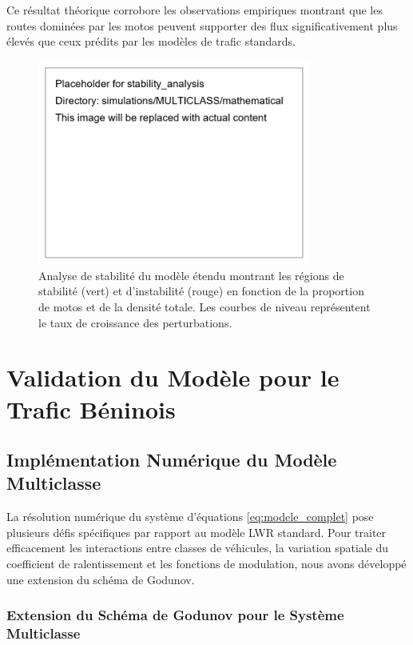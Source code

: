 Ce résultat théorique corrobore les observations empiriques montrant que les routes dominées par les motos peuvent supporter des flux significativement plus élevés que ceux prédits par les modèles de trafic standards.

\begin{figure}[htbp]
\centering
\includegraphics[width=0.8\textwidth]{simulations/MULTICLASS/mathematical/stability_analysis}
\caption{Analyse de stabilité du modèle étendu montrant les régions de stabilité (vert) et d'instabilité (rouge) en fonction de la proportion de motos et de la densité totale. Les courbes de niveau représentent le taux de croissance des perturbations.}
\label{fig:stability_analysis}
\end{figure}

\section{Validation du Modèle pour le Trafic Béninois}
\label{sec:validation_benin}

\subsection{Implémentation Numérique du Modèle Multiclasse}
\label{subsec:implementation_numerique}

La résolution numérique du système d'équations \eqref{eq:modele_complet} pose plusieurs défis spécifiques par rapport au modèle LWR standard. Pour traiter efficacement les interactions entre classes de véhicules, la variation spatiale du coefficient de ralentissement et les fonctions de modulation, nous avons développé une extension du schéma de Godunov.

\subsubsection{Extension du Schéma de Godunov pour le Système Multiclasse}
\label{subsubsec:extension_godunov}

